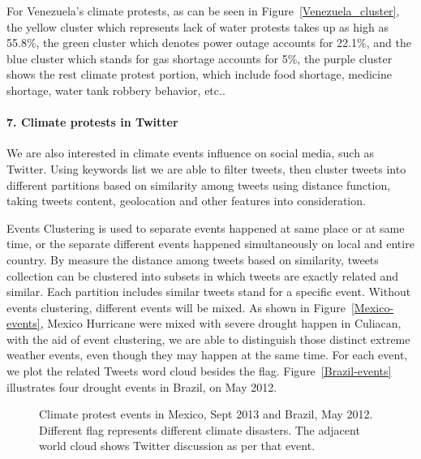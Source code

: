 \documentclass[9pt,twocolumn,twoside]{pnas-new}
\begin{document}
For Venezuela's climate protests, as can be seen in Figure~\ref{Venezuela_cluster}, the yellow cluster which represents lack of water protests takes up as high as 55.8\%, the green cluster which denotes power outage accounts for 22.1\%, and the blue cluster which stands for gas shortage accounts for 5\%, the purple cluster shows the rest climate protest portion, which include food shortage, medicine shortage, water tank robbery behavior, etc..


\paragraph{7. Climate protests in Twitter}
We are also interested in climate events influence on social media, such as Twitter. Using keywords list we are able to filter tweets, then cluster tweets into different partitions based on similarity among tweets using distance function, taking tweets content, geolocation and other features into consideration.

Events Clustering is used to separate events happened at same place or at same time, or the separate different events happened simultaneously on local and entire country. By measure the distance among tweets based on similarity, tweets collection can be clustered into subsets in which tweets are exactly related and similar. Each partition includes similar tweets stand for a specific event. Without events clustering, different events will be mixed. As shown in Figure~\ref{Mexico-events}, Mexico Hurricane were mixed with severe drought happen in Culiacan, with the aid of event clustering, we are able to distinguish those distinct extreme weather events, even though they may happen at the same time. For each event, we plot the related Tweets word cloud besides the flag. Figure~\ref{Brazil-events} illustrates four drought events in Brazil, on May 2012.

\begin{figure}[t]
	\centering
	\caption{Climate protest events in Mexico, Sept 2013 and Brazil, May 2012. Different flag represents different climate disasters. The adjacent world cloud shows Twitter discussion as per that event. }
\label{Twitter-events}
\end{figure}
\end{document}
